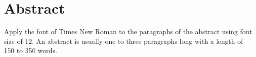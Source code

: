 \section*{Abstract}
\selectfont
\justifying %
\noindent Apply the font of Times New Roman to the paragraphs of the abstract using font size of 12. An abstract is usually one to three paragraphs long with a length of 150 to 350 words.